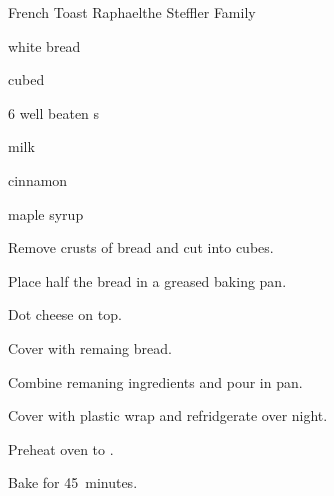 \begin{recipe}{French Toast Raphael}{the Steffler Family}{}

\begin{ingredients}
\item {} white bread
\item {} cubed 
\item 6 well beaten s
\item {} milk
\item \tp{\half} cinnamon
\item \C{\third} maple syrup
\end{ingredients}

\begin{directions}
\item Remove crusts of bread and cut into  cubes.
\item Place half the bread in a greased  baking pan.
\item Dot cheese on top.
\item Cover with remaing bread.
\item Combine remaning ingredients and pour in pan.
\item Cover with plastic wrap and refridgerate over night.
\item Preheat oven to .
\item Bake for 45~minutes.
\end{directions}
\end{recipe}
